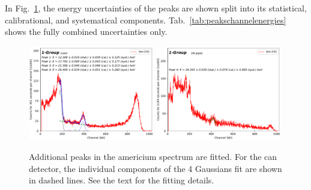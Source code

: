 In Fig.~\ref{fig:peaksearch}, the energy uncertainties of the peaks are shown split into its statistical, calibrational, and systematical components. Tab.~\ref{tab:peakschannelenergies} shows the fully combined uncertainties only.

\begin{figure}[htb]
  \includegraphics[width=0.49\textwidth,page=1]{graphics/peaksearch.pdf}
  \includegraphics[width=0.49\textwidth,page=1]{graphics/alupeaksearch.pdf}
  \caption{Additional peaks in the americium spectrum are fitted. For the can detector, the individual components of the 4 Gaussians fit are shown in dashed lines. See the text for the fitting details.}
  \label{fig:peaksearch}
\end{figure}

